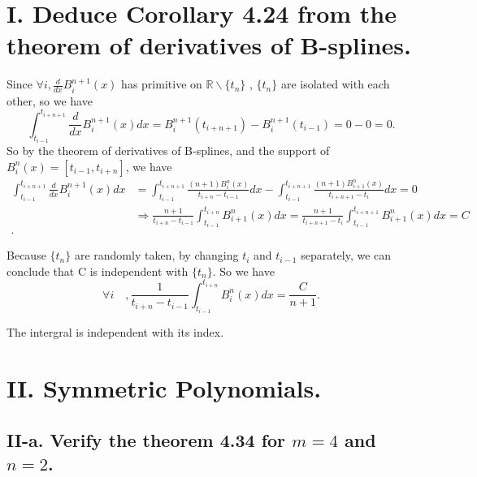 \documentclass[twoside,a4paper]{article}
\begin{document}
\pagestyle{fancy}
\fancyhead{}


\section*{I. \small{Deduce Corollary 4.24 from the theorem of derivatives of B-splines.}}

Since $\forall i, \frac{d}{dx}B_{i}^{n+1}\left( x \right) $ has primitive on $\mathbb{R}\backslash \{t_{n}\}$
, $\{t_{n}\}$ are isolated with each other, so we have 
\[\int_{t_{i-1}}^{t_{i+n+1}}\frac{d}{dx}B_{i}^{n+1}\left( x \right)dx
	=B_{i}^{n+1}\left( t_{i+n+1} \right)-B_{i}^{n+1}\left(t_{i-1}  \right)=0-0=0  
.\] 
So by the theorem of derivatives of B-splines, and the support of $B_{i}^{n}\left( x \right)=[t_{i-1},t_{i+n}] $, we have
\begin{equation*}
	\begin{split}
	\int_{t_{i-1}}^{t_{i+n+1}}\frac{d}{dx}B_{i}^{n+1}\left( x \right)dx 
	&=\int_{t_{i-1}}^{t_{i+n+1}}\frac{\left( n+1 \right) B_{i}^{n}\left( x \right) }{t_{i+n}-t_{i-1}}dx
	-\int_{t_{i-1}}^{t_{i+n+1}}\frac{\left( n+1 \right)B_{i+1}^{n}\left( x \right)  }{t_{i+n+1}-t_{i}}dx=0\\
	&\Longrightarrow \frac{n+1}{t_{i+n}-t_{i-1}}\int_{t_{i-1}}^{t_{i+n}}B_{i+1}^{n}\left( x \right)dx
	=\frac{n+1}{t_{i+n+1}-t_{i}}\int_{t_{i-1}}^{t_{i+n+1}}B_{i+1}^{n}\left( x \right)dx =C\\.
        \end{split}
\end{equation*}

Because $\{t_{n}\}$ are randomly taken, by changing $t_{i}$ and $t_{i-1}$ separately, we can conclude that C is independent with $\{t_{n}\}$.
So we have 
\[ 
	\forall i\quad, \frac{1}{t_{i+n} - t_{i-1}}\int_{t_{i-1}}^{t_{i+n}}B_{i}^{n}\left( x \right)dx =\frac{C}{n+1}
.\]

The intergral is independent with its index.

\section*{II. \small{Symmetric Polynomials.}}

\subsection*{II-a. \small{Verify the theorem 4.34 for $m=4$ and  $n=2$.}}
\end{document}
